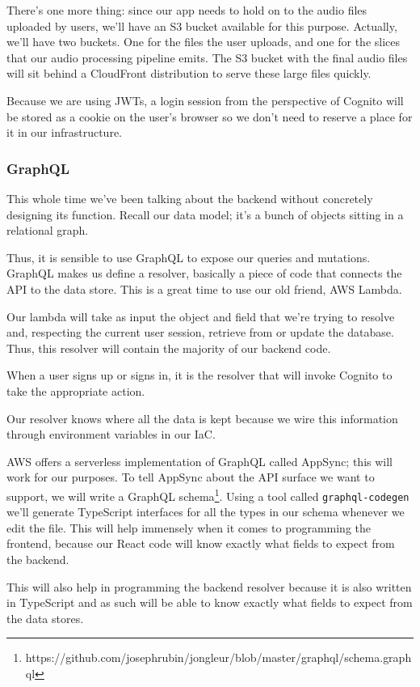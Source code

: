 \documentclass{article}
\begin{document}
There's one more thing: since our app needs to hold on to the audio files uploaded by users, we'll have an S3 bucket available for this purpose.
Actually, we'll have two buckets.
One for the files the user uploads, and one for the slices that our audio processing pipeline emits.
The S3 bucket with the final audio files will sit behind a CloudFront distribution to serve these large files quickly.

Because we are using JWTs, a login session from the perspective of Cognito will be stored as a cookie on the user's browser so we don't need to reserve a place for it in our infrastructure.

\subsubsection{GraphQL}

This whole time we've been talking about the backend without concretely designing its function.
Recall our data model; it's a bunch of objects sitting in a relational graph.

Thus, it is sensible to use GraphQL to expose our queries and mutations.
GraphQL makes us define a resolver, basically a piece of code that connects the API to the data store.
This is a great time to use our old friend, AWS Lambda.

Our lambda will take as input the object and field that we're trying to resolve and, respecting the current user session, retrieve from or update the database.
Thus, this resolver will contain the majority of our backend code.

When a user signs up or signs in, it is the resolver that will invoke Cognito to take the appropriate action.

Our resolver knows where all the data is kept because we wire this information through environment variables in our IaC.

AWS offers a serverless implementation of GraphQL called AppSync; this will work for our purposes.
To tell AppSync about the API surface we want to support, we will write a GraphQL schema\footnote{https://github.com/josephrubin/jongleur/blob/master/graphql/schema.graphql}.
Using a tool called \texttt{graphql-codegen} we'll generate TypeScript interfaces for all the types in our schema whenever we edit the file.
This will help immensely when it comes to programming the frontend, because our React code will know exactly what fields to expect from the backend.

This will also help in programming the backend resolver because it is also written in TypeScript and as such will be able to know exactly what fields to expect from the data stores.
\end{document}
